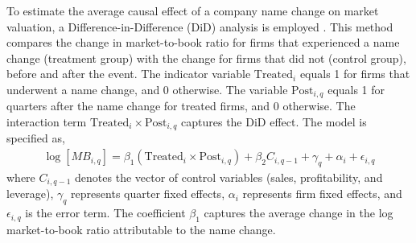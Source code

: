 \documentclass[a4paper,11pt]{report}
\begin{document}
To estimate the average causal effect of a company name change on market valuation, a Difference-in-Difference (DiD) analysis is employed \cite{card}. This method compares the change in market-to-book ratio for firms that experienced a name change (treatment group) with the change for firms that did not (control group), before and after the event. The indicator variable $\text{Treated}_i$ equals 1 for firms that underwent a name change, and 0 otherwise. The variable $\text{Post}_{i,q}$ equals 1 for quarters after the name change for treated firms, and 0 otherwise. The interaction term $\text{Treated}_i \times \text{Post}_{i,q}$ captures the DiD effect. The model is specified as,
\begin{align}
    \log\left[MB_{i,q}\right] = \beta_1 \left(\text{Treated}_i \times \text{Post}_{i,q}\right) 
    + \beta_2 C_{i,q-1} + \gamma_q + \alpha_i + \epsilon_{i,q}
\end{align}
where $C_{i,q-1}$ denotes the vector of control variables (sales, profitability, and leverage), $\gamma_q$ represents quarter fixed effects, $\alpha_i$ represents firm fixed effects, and $\epsilon_{i,q}$ is the error term. The coefficient $\beta_1$ captures the average change in the log market-to-book ratio attributable to the name change.

\begin{comment}
To understand the short terms effects of a company name change, an event study is conducted \cite{event_study1, event_study_2}. The analysis focuses on an event window spanning four quarters before and after the name change (i.e., from t $= -4$ to t = $= +4$), capturing any pre-event anticipation effects as well as the post-event market response over a one-year period. This allows for a balanced perspective on how investors react to changes in a firm’s name change within a relatively short time frame. The structure of event study is, 
\begin{align}
    log \left[MB_{i,q}\right] = \sum_{k=-4}^{4} \eta_k \cdot \text{REL}_{i,q}^{(k)} + {\beta_2}C_{i,q-1} +
               \gamma_q + \alpha_i + \epsilon_{i,q}
\end{align}
The control variable are same as the fixed-effect regression. $\text{REL}_{i,q}^{(k)}$ denotes dummy variables indicating the relative quarter $k$ from the event and $\eta_k$ capture the effect of the name change in each event-time quarter. $\gamma_q$ and $\alpha_i$
represent quarter and firm fixed effects respectively. 
\end{comment}
\end{document}
